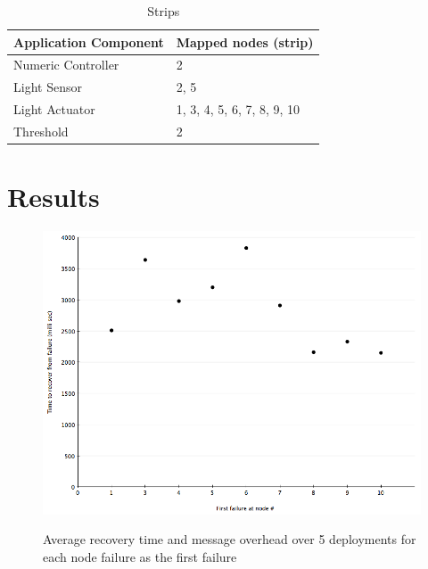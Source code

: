 \begin{table}
\centering
\caption{Strips}
\label{tbl:mapping-result}
  \begin{tabular}{|l|l|}
  \hline
  \textbf{Application Component} & \textbf{Mapped nodes (strip)} \\
  \hline
  Numeric Controller & 2 \\
  \hline
  Light Sensor & 2, 5 \\
  \hline
  Light Actuator & 1, 3, 4, 5, 6, 7, 8, 9, 10 \\
  \hline
  Threshold & 2 \\
  \hline
  \end{tabular}
\end{table}






\section{Results}
\label{s:results}

\begin{figure}[h!]
\caption{Average recovery time and message overhead over 5 deployments for each
node failure as the first failure}
\centering
    \includegraphics[width=\linewidth]{figures/results-average-recovery-time-plus-message-overhead}
\label{fig:results-average-recovery-time-plus-message-overhead}
\end{figure}

